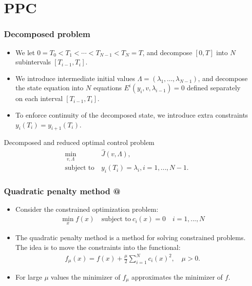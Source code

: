 \documentclass[9pt]{beamer}
\makeatletter
\newcommand*{\rom}[1]{\expandafter\@slowromancap\romannumeral #1@}
\makeatother
\begin{document}
\section{PPC}
\begin{frame}
\frametitle{Decomposed problem}
\begin{itemize}
\item{We let $0=T_0<T_1<\cdots<T_{N-1}<T_N=T$, and decompose $[0,T]$ into $N$ subintervals $[T_{i-1},T_i]$. }
\item{We introduce intermediate initial values $\Lambda=(\lambda_1,...,\lambda_{N-1})$, and decompose the state equation into $N$ equations $E^i(y_i,v,\lambda_{i-1})=0$ defined separately on each interval $[T_{i-1},T_i]$.}
\item{To enforce continuity of the decomposed state, we introduce extra constraints $y_i(T_i)=y_{i+1}(T_i)$.}
\end{itemize}
\begin{block}{Decomposed and reduced optimal control problem}
\begin{align*}
\min_{v,\Lambda} &\hat J(v,\Lambda), \\
\textrm{subject to} \ &y_i(T_i)=\lambda_i,i=1,...,N-1. 
\end{align*}
\end{block}
\end{frame}
\begin{frame}
\frametitle{Quadratic penalty method \rom{1}}
\begin{itemize}
\item{Consider the constrained optimization problem:
\begin{align*}
\min_x f(x) \quad \textrm{subject to} \ c_i(x)=0 \quad i=1,...,N
\end{align*}}
\item{The quadratic penalty method is a method for solving constrained problems. The idea is to move the constraints into the functional:
\begin{align*}
f_{\mu}(x) = f(x) + \frac{\mu }{2}\sum_{i=1}^N c_i(x)^2, \quad \mu>0.
\end{align*}}
\item{For large $\mu$ values the minimizer of $f_{\mu}$ approximates the minimizer of $f$.}
\end{itemize}
\end{frame}
\end{document}
